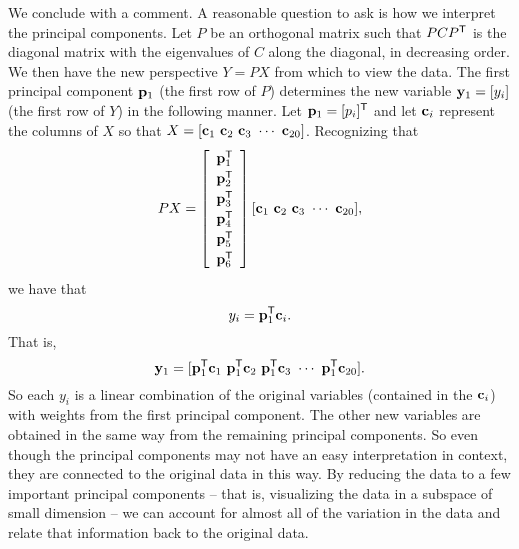 We conclude with a comment. A reasonable question to ask is how we interpret the principal components. Let $P$ be an orthogonal matrix such that $PCP^{\mathsf{T}}$ is the diagonal matrix with the eigenvalues of $C$ along the diagonal, in decreasing order. We then have the new perspective $Y = PX$ from which to view the data. The first principal component $\mathbf{p}_1$ (the first row of $P$) determines the new variable $\mathbf{y}_1 = [y_i]$ (the first row of $Y$) in the following manner. Let $\mathbf{p}_1 = [p_i]^{\mathsf{T}}$ and let $\mathbf{c}_i$ represent the columns of $X$ so that $X = [\vc_1 \ \vc_2 \ \vc_3 \ \cdots \ \vc_{20}]$.  Recognizing that 
\[PX =  \left[ \renewcommand{\arraystretch}{1.2} \begin{array}{c} \vp_1^{\tr} \\ \vp_2^{\tr} \\ \vp_3^{\tr} \\ \vp_4^{\tr} \\\vp_5^{\tr} \\ \vp_6^{\tr} \end{array} \right]  [\vc_1 \ \vc_2 \ \vc_3 \ \cdots \ \vc_{20}],\]
we have that 
\[y_i = \mathbf{p}_1^{\mathsf{T}} \mathbf{c}_i.\]
That is,
\[\vy_1 = [\vp_1^{\tr}\vc_1 \ \vp_1^{\tr} \vc_2 \ \vp_1^{\tr} \vc_3 \ \cdots \ \vp_{1}^{\tr} \vc_{20}].\]
So each $y_i$ is a linear combination of the original variables (contained in the $\mathbf{c}_i$) with weights from the first principal component. The other new variables are obtained in the same way from the remaining principal components. So even though the principal components may not have an easy interpretation in context, they are connected to the original data in this way. By reducing the data to a few important principal components -- that is, visualizing the data in a subspace of small dimension -- we can account for almost all of the variation in the data and relate that information back to the original data.  




